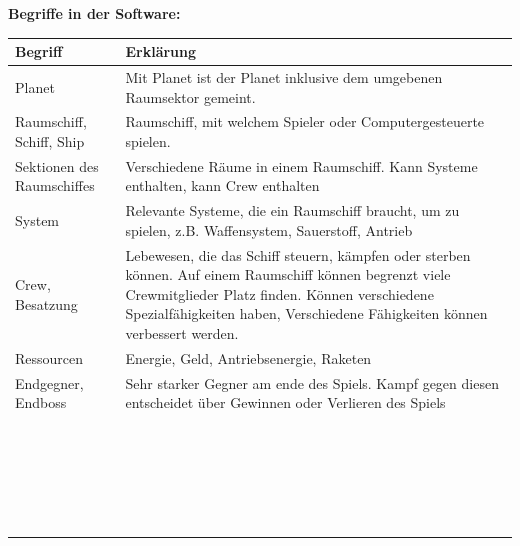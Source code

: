 \documentclass[fontsize=12pt,paper=a4,twoside]{scrartcl}
\begin{document}
\textbf{Begriffe in der Software:}
\begin{center}
\begin{tabular}{|p{3cm}|p{12cm}|}
\hline
Begriff & Erklärung \\ \hline
Planet & Mit Planet ist der Planet inklusive dem umgebenen Raumsektor gemeint. \\ \hline
Raumschiff, Schiff, Ship & Raumschiff, mit welchem Spieler oder Computergesteuerte spielen. \\ \hline
Sektionen des Raumschiffes & Verschiedene Räume in einem Raumschiff. Kann Systeme enthalten, kann Crew enthalten\\ \hline
System & Relevante Systeme, die ein Raumschiff braucht, um zu spielen, z.B. Waffensystem, Sauerstoff, Antrieb \\ \hline
Crew, Besatzung & Lebewesen, die das Schiff steuern, kämpfen oder sterben können. Auf einem Raumschiff können begrenzt viele Crewmitglieder Platz finden. Können verschiedene Spezialfähigkeiten haben, Verschiedene Fähigkeiten können verbessert werden. \\ \hline
Ressourcen & Energie, Geld, Antriebsenergie, Raketen \\ \hline
Endgegner, Endboss & Sehr starker Gegner am ende des Spiels. Kampf gegen diesen entscheidet über Gewinnen oder Verlieren des Spiels \\ \hline  
 & \\ \hline
 & \\ \hline
 & \\ \hline
 & \\ \hline  
 & \\ \hline
 & \\ \hline
 & \\ \hline
 & \\ \hline  
 & \\ \hline
 & \\ \hline
 & \\ \hline
 & \\ \hline  
 & \\ \hline
 & \\ \hline
 & \\ \hline
 & \\ \hline  
 & \\ \hline
 & \\ \hline
 & \\ \hline
 & \\ \hline  
 & \\ \hline
 & \\ \hline
 & \\ \hline
\end{tabular}
\end{center}
\end{document}
